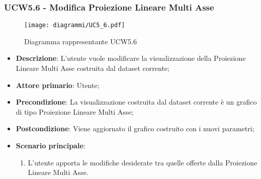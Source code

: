 \newpage
\subsubsection{UCW5.6 - Modifica Proiezione Lineare Multi Asse}
\label{ssub:ucw5.6}
\begin{figure}[h]
    \centering
    \texttt{[image: diagrammi/UC5\_6.pdf]}
    \caption{Diagramma rappresentante UCW5.6}
    \label{fig:UCW5.6}
\end{figure}

\begin{itemize}
    \item \textbf{Descrizione}: L’utente vuole modificare la visualizzazione della Proiezione Lineare Multi Asse
                                costruita dal dataset corrente;

    \item \textbf{Attore primario}: Utente;

    \item \textbf{Precondizione}:   La visualizzazione costruita dal dataset corrente è un grafico di tipo Proiezione Lineare Multi Asse;
    \item \textbf{Postcondizione}:  Viene aggiornato il grafico costruito con i nuovi parametri;

	\item \textbf{Scenario principale}:
		\begin{enumerate}
            \item L'utente apporta le modifiche desiderate tra quelle offerte dalla Proiezione Lineare Multi Asse.
        \end{enumerate}
\end{itemize}

